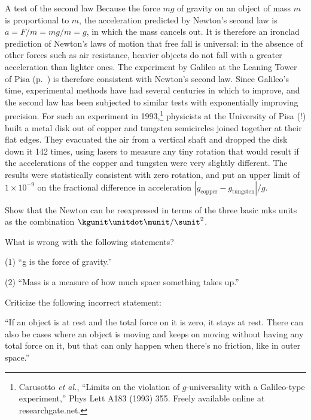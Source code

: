 \begin{eg}{A test of the second law}\label{eg:carusotto}
Because the force $mg$ of gravity on an object of mass $m$ is proportional to $m$,
the acceleration predicted by Newton's second law is $a=F/m=mg/m=g$, in which the mass
cancels out. It is therefore an ironclad prediction of Newton's laws of motion that
free fall is universal: in the absence of other forces such as air resistance,
heavier objects do not fall with a greater acceleration than lighter ones. 
The experiment by Galileo at the Leaning Tower of Pisa (p.~\pageref{fig:galileo-drops-balls})
is therefore consistent with Newton's second law. Since Galileo's time, experimental methods
have had several centuries in which to improve, and the second law has been subjected to similar
tests with exponentially improving precision. For such an experiment in 
1993,\footnote{Carusotto \emph{et al.}, ``Limits on the violation of $g$-universality with a
Galileo-type experiment,'' Phys Lett A183 (1993) 355. Freely available online at
researchgate.net.} physicists at the University of Pisa (!) built a metal disk out of
copper and tungsten semicircles joined together at their flat edges. They evacuated the air
from a vertical shaft and dropped the disk down it 142 times, using lasers to measure any
tiny rotation that would result if the accelerations of the copper and tungsten were very slightly
different. The results were statistically consistent with zero rotation, and put an upper limit
of $1\times10^{-9}$ on the fractional difference in acceleration $|g_\text{copper}-g_{\text{tungsten}}|/g$.
\end{eg}

\startdqs

\begin{dq}
Show that the Newton can be reexpressed in terms of the
three basic mks units as the combination $\kgunit\unitdot\munit/\sunit^2$.
\end{dq}

\begin{dq}
What is wrong with the following statements?

    (1) ``g is the force of gravity.''

    (2) ``Mass is a measure of how much space something takes up.''
\end{dq}

\begin{dq}
Criticize the following incorrect statement:

``If an object is at rest and the total force on it is zero,
it stays at rest. There can also be cases where an object is
moving and keeps on moving without having any total force on
it, but that can only happen when there's no friction,
like in outer space.''
\end{dq}

